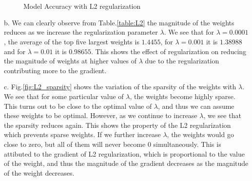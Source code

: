 \documentclass{article}
\begin{document}
\begin{figure}[!h]
    \\
    \\
\caption{Model Accuracy with L2 regularization}
    \label{fig:L2_vs_lambda}%
\end{figure}

b. We can clearly observe from Table.\ref{table:L2} the magnitude of the weights reduces as we increase the regularization parameter $\lambda$. We see that for $\lambda=0.0001$, the average of the top five largest weights is $1.4455$, for $\lambda=0.001$ it is $1.38988$ and for $\lambda=0.01$ it is $0.98655$. This shows the effect of regularization on reducing the magnitude of weights at higher values of $\lambda$ due to the regularization contributing more to the gradient.\\
\vspace{\baselineskip}

c. Fig.\ref{fig:L2_sparsity} shows the variation of the sparsity of the weights with $\lambda$. We see that for some particular value of $\lambda$, the weights become highly sparse. This turns out to be close to the optimal value of $\lambda$, and thus we can assume these weights to be optimal. However, as we continue to increase $\lambda$, we see that the sparsity reduces again. This shows the property of the L2 regularization which prevents sparse weights. If we further increase $\lambda$, the weights would go close to zero, but all of them will never become $0$ simultaneously. This is attibuted to the gradient of L2 regularization, which is proportional to the value of the weight, and thus the magnitude of the gradient decreases as the magnitude of the weight decreases.
\end{document}
